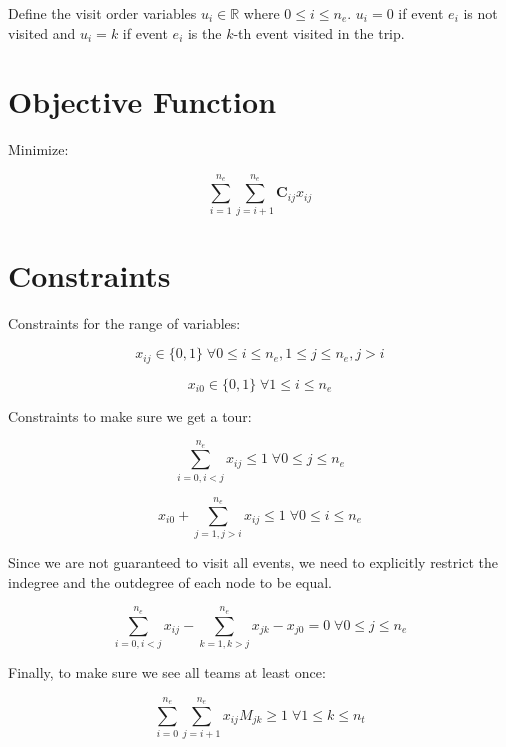 \documentclass[11pt]{article}
\begin{document}
Define the visit order variables $u_i \in \mathbb{R}$ where $0 \leq i \leq n_e$. $u_i = 0$ if event $e_i$ is not visited and $u_i = k$ if event $e_i$ is the $k$-th event visited in the trip.

\section{Objective Function}
Minimize:

\begin{equation} \label{eq:objective}
\sum_{i=1}^{n_e} \sum_{j=i+1}^{n_e} \mathbf{C}_{ij} x_{ij}
\end{equation}

\section{Constraints}
Constraints for the range of variables:

\begin{equation} \label{constr:x}
    x_{ij} \in \{0, 1\} \; \forall 0 \leq i \leq n_e, 1 \leq j \leq n_e, j > i
\end{equation}

\begin{equation} \label{constr:x_dummy}
    x_{i0} \in \{0, 1\} \; \forall 1 \leq i \leq n_e
\end{equation}

Constraints to make sure we get a tour:

\begin{equation} \label{constr:in_edge}
    \sum_{i=0, i < j}^{n_e} x_{ij} \leq 1 \; \forall 0 \leq j \leq n_e
\end{equation}

\begin{equation} \label{constr:out_edge}
    x_{i0} + \sum_{j=1, j > i}^{n_e} x_{ij} \leq 1 \; \forall 0 \leq i \leq n_e
\end{equation}

Since we are not guaranteed to visit all events, we need to explicitly restrict the indegree and the outdegree of each node to be equal.

\begin{equation} \label{constr:equal_degree}
    \sum_{i=0, i < j}^{n_e} x_{ij} - \sum_{k=1, k > j}^{n_e} x_{jk} - x_{j0} = 0 \; \forall 0 \leq j \leq n_e
\end{equation}

Finally, to make sure we see all teams at least once:

\begin{equation} \label{constr:teams}
    \sum_{i=0}^{n_e} \sum_{j=i + 1}^{n_e} x_{ij}M_{jk} \geq 1 \; \forall 1 \leq k \leq n_t
\end{equation}
\end{document}
